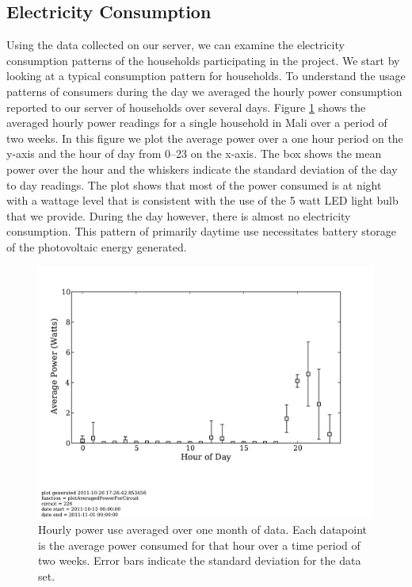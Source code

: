\documentclass{sig-alternate}
\begin{document}


\subsection{Electricity Consumption}
Using the data collected on our server, we can examine the electricity
consumption patterns of the households participating in the project.
We start by looking at a typical consumption pattern for households.
To understand the usage patterns of consumers during the day
we averaged the hourly power consumption reported to our server
of households over several days. 
Figure \ref{average_power} shows the averaged
hourly power readings for a single household in Mali 
over a period of two weeks.
In this figure we plot the average power over a one hour period
on the y-axis and the hour of day from 0--23 on the x-axis.
The box shows the mean power over the hour and the whiskers indicate
the standard deviation of the day to day readings.
The plot shows that most of the power consumed is at night with a 
wattage level that is consistent
with the use of the 5 watt LED light bulb that we provide.
During the day however, there is almost no electricity consumption.
This pattern of primarily daytime use necessitates battery storage 
of the photovoltaic energy generated.

\begin{figure}[]
\begin{center}
\includegraphics[trim = 0in 1.3in 0in 0in, clip, width=\columnwidth]
                 {figures/average_power.pdf}
\end{center}
\caption{Hourly power use averaged over one month of data.  Each datapoint is the
average power consumed for that hour over a time period of two weeks.  Error bars
indicate the standard deviation for the data set.}
\label{average_power}
\end{figure}
\end{document}
